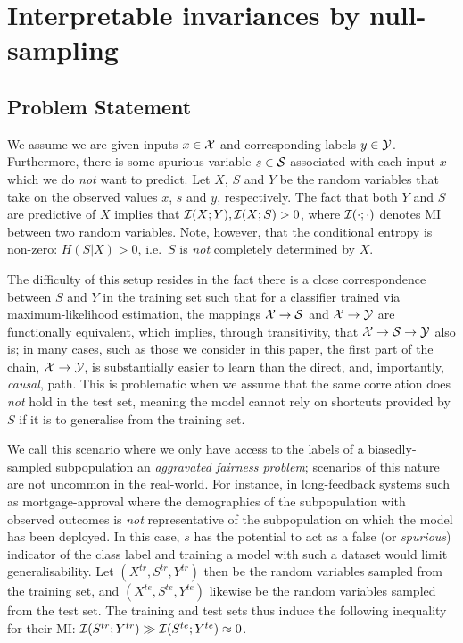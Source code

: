 \section{Interpretable invariances by null-sampling}\label{ssec:general}
\subsection{Problem Statement}
%
\noindent
%
We assume we are given inputs $x \in {\mathcal{X}}$ and corresponding labels $y \in {\mathcal{Y}}$.
%
Furthermore, there is some spurious variable $s \in {\mathcal{S}}$ associated with each input $x$ which
we do \emph{not} want to predict. 
%
Let $X$, $S$ and $Y$ be the random variables that take on the observed values $x$, $s$ and $y$,
respectively. 
%
The fact that both $Y$ and $S$ are predictive of $X$ implies that ${\mathcal{I}}(X;Y), {\mathcal{I}}(X;S) > 0$, where
${\mathcal{I}}(\cdot ;\cdot)$ denotes \ac{MI} between two random variables.
%
Note, however, that the conditional entropy is non-zero: \( H(S|X) > 0 \), i.e.\ $S$ is \emph{not}
completely determined by $X$.

The difficulty of this setup resides in the fact there is a close correspondence between $S$ and
$Y$ in the training set such that for a classifier trained via maximum-likelihood estimation, the
mappings \( {\mathcal{X}} \to {\mathcal{S}} \) and \({\mathcal{X}} \to {\mathcal{Y}} \) are functionally equivalent, which implies, through
transitivity, that \({\mathcal{X}} \to {\mathcal{S}} \to {\mathcal{Y}} \) also is; in many cases, such as those we consider in
this paper, the first part of the chain, \( {\mathcal{X}} \to {\mathcal{Y}} \), is substantially easier to learn than
the direct, and, importantly, \emph{causal}, path.
%
This is problematic when we assume that the same correlation does \emph{not} hold in the test set,
meaning the model cannot rely on shortcuts provided by $S$ if it is to generalise from the training
set.

We call this scenario where we only have access to the labels of a biasedly-sampled subpopulation
an \emph{aggravated fairness problem}; scenarios of this nature are not uncommon in the real-world. 
%
For instance, in long-feedback systems such as mortgage-approval where the demographics of the
subpopulation with observed outcomes is \emph{not} representative of the subpopulation on which the
model has been deployed. 
%
In this case, $s$ has the potential to act as a false (or \emph{spurious}) indicator of the class
label and training a model with such a dataset would limit generalisability. 
%
Let \( (X^{tr}, S^{tr}, Y^{tr}) \) then be the random variables sampled from the training set, and
\( (X^{te}, S^{te}, Y^{te}) \) likewise be the random variables sampled from the test set.
%
The training and test sets thus induce the following inequality for their \ac{MI}:
\( {\mathcal{I}}(S^{tr}; Y^{tr}) \gg {\mathcal{I}}(S^{te}; Y^{te}) \approx 0 \).

